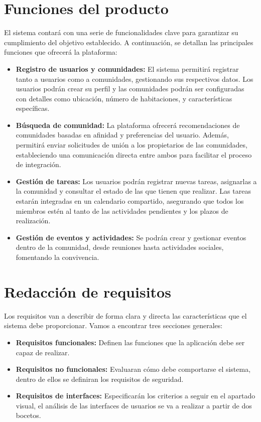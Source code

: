 \section{Funciones del producto}
El sistema contará con una serie de funcionalidades clave para garantizar su cumplimiento del objetivo establecido. A continuación, se detallan las principales funciones que ofrecerá la plataforma:
\begin{itemize}
    \item \textbf{Registro de usuarios y comunidades:} El sistema permitirá registrar tanto a usuarios como a comunidades, gestionando sus respectivos datos. Los usuarios podrán crear su perfil y las comunidades podrán ser configuradas con detalles como ubicación, número de habitaciones, y características específicas.
    \item \textbf{Búsqueda de comunidad:} La plataforma ofrecerá recomendaciones de comunidades basadas en afinidad y preferencias del usuario. Además, permitirá enviar solicitudes de unión a los propietarios de las comunidades, estableciendo una comunicación directa entre ambos para facilitar el proceso de integración.
    \item \textbf{Gestión de tareas:} Los usuarios podrán registrar nuevas tareas, asignarlas a la  comunidad y consultar el estado de las que tienen que realizar. Las tareas estarán integradas en un calendario compartido, asegurando que todos los miembros estén al tanto de las actividades pendientes y los plazos de realización.
    \item \textbf{Gestión de eventos y actividades:} Se podrán crear y gestionar eventos dentro de la comunidad, desde reuniones hasta actividades sociales, fomentando la convivencia.
\end{itemize}

\section{Redacción de requisitos}
Los requisitos van a describir de forma clara y directa las características que el sistema debe proporcionar.  
Vamos a encontrar tres secciones generales:

\begin{itemize}
    \item \textbf{Requisitos funcionales:} Definen las funciones que la aplicación debe ser capaz de realizar.
    \item \textbf{Requisitos no funcionales:} Evaluaran cómo debe comportarse el sistema, dentro de ellos se definiran los requisitos de seguridad.
    \item \textbf{Requisitos de interfaces:} Especificarán los criterios a seguir en el apartado visual, el análisis de las interfaces de usuarios se va a realizar a partir de dos bocetos.
\end{itemize}

